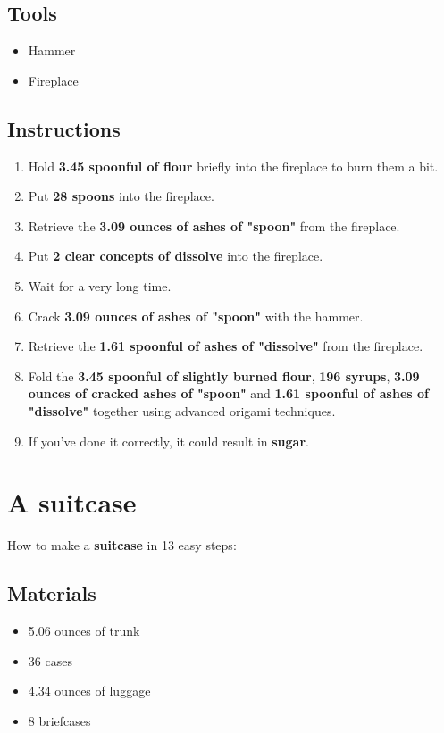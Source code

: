 \documentclass{article}
\begin{document}
\subsection{Tools}\begin{itemize}
\item 
Hammer
\item 
Fireplace
\end{itemize}
\subsection{Instructions}\begin{enumerate}
\item 
Hold \textbf{3.45 spoonful of flour} briefly into the fireplace to burn them a bit.
\item 
Put \textbf{28 spoons} into the fireplace.
\item 
Retrieve the \textbf{3.09 ounces of ashes of "spoon"} from the fireplace.
\item 
Put \textbf{2 clear concepts of dissolve} into the fireplace.
\item 
Wait for a very long time.
\item 
Crack \textbf{3.09 ounces of ashes of "spoon"} with the hammer.
\item 
Retrieve the \textbf{1.61 spoonful of ashes of "dissolve"} from the fireplace.
\item 
Fold the \textbf{3.45 spoonful of slightly burned flour}, \textbf{196 syrups}, \textbf{3.09 ounces of cracked ashes of "spoon"} and \textbf{1.61 spoonful of ashes of "dissolve"} together using advanced origami techniques.
\item 
If you've done it correctly, it could result in \textbf{sugar}.
\end{enumerate}
\newpage
\section{A suitcase}How to make a \textbf{suitcase} in 13 easy steps:

\subsection{Materials}\begin{itemize}
\item 
5.06 ounces of trunk
\item 
36 cases
\item 
4.34 ounces of luggage
\item 
8 briefcases
\end{itemize}
\end{document}
